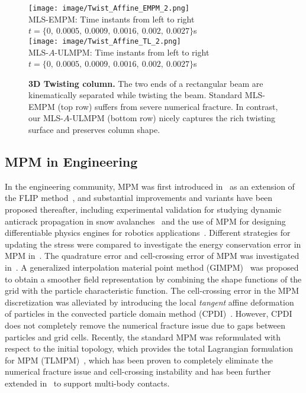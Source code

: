 \begin{figure*}[h]
    \vspace{-4mm}
    \centering
    \texttt{[image: image/Twist\_Affine\_EMPM\_2.png]}\\
     MLS-EMPM: Time instants from left to right $t=\{0,\:0.0005,\:0.0009,\:0.0016,\: 0.002,\:0.0027\}$s\\
    \texttt{[image: image/Twist\_Affine\_TL\_2.png]}\\
     MLS-$A$-ULMPM:  Time instants from left to right $t=\{0,\:0.0005,\:0.0009,\:0.0016,\: 0.002,\:0.0027\}$s\\
     \vspace{-4mm}
    \caption{\textbf{3D Twisting column.} The two ends of a rectangular beam are kinematically separated while twisting the beam. Standard MLS-EMPM (top row) suffers from severe numerical fracture. In contrast, our MLS-$A$-ULMPM (bottom row) nicely captures the rich twisting surface and preserves column shape.}
    \label{fig:bar_twisting}
    \vspace{-3mm}
\end{figure*}

\subsection{MPM in Engineering}

In the engineering community, MPM was first introduced in~\cite{Sulsky:1994:Particle} as an extension of the FLIP method~\cite{Brackbill:1988:Flip}, and substantial improvements and variants have been proposed thereafter, including experimental validation for studying dynamic anticrack propagation in snow avalanches~\cite{gaume:2018:dynamic} and the use of MPM for designing differentiable physics engines for robotics applications~\cite{Hu:2019:ChainQueen}.
Different strategies for updating the stress were compared to investigate the energy conservation error in MPM in~\cite{Bardenhagen:2002:Energy}. The quadrature error and cell-crossing error of MPM was investigated in~\cite{Steffen:2008:Analysis}.
A generalized interpolation material point method (GIMPM)~\cite{Bardenhagen:2004:GIMPM} was proposed to obtain a smoother field representation by combining the shape functions of the grid with the particle characteristic function. 
The cell-crossing error in the MPM discretization was alleviated by introducing the local \emph{tangent} affine deformation of particles in the convected particle domain method (CPDI)~\cite{Sadeghirad:2011:CPDI}. 
However, CPDI does not completely remove the numerical fracture issue due to gaps between particles and grid cells. 
Recently, the standard MPM was reformulated with respect to the initial topology, which provides the total Lagrangian formulation for MPM (TLMPM)~\cite{De:2020:TLMPM}, which has been proven to completely eliminate the numerical fracture issue and cell-crossing instability and has been further extended in~\cite{De:2021:TLMPM} to support multi-body contacts. 


